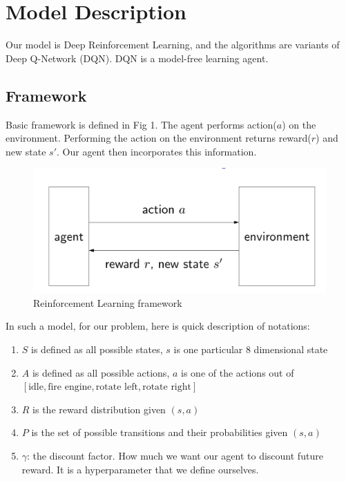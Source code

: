 \section{Model Description}
\label{sec:Model}

Our model is Deep Reinforcement Learning, and the algorithms are variants of Deep Q-Network (DQN). DQN is a model-free learning agent.

\subsection{Framework}
Basic framework is defined in Fig 1. The agent performs action($a$) on the environment. Performing the action on the environment returns reward($r$) and new state $s'$. Our agent then incorporates this information.

\begin{figure}%
\centering
\includegraphics[scale=0.3]{reinforcement_framework.png}%
\caption{Reinforcement Learning framework}%
\label{fig:datastats}%
\end{figure}

In such a model, for our problem, here is quick description of notations:
\begin{enumerate}
\item $S$ is defined as all possible states, $s$ is one particular 8 dimensional state
\item $A$ is defined as all possible actions, $a$ is one of the actions out of $[\text{idle}, \text{fire engine}, \text{rotate left}, \text{rotate right}]$
\item $R$ is the reward distribution given $(s, a)$
\item $P$ is the set of possible transitions and their probabilities given $(s, a)$
\item $\gamma$: the discount factor. How much we want our agent to discount future reward. It is a hyperparameter that we define ourselves.
\end{enumerate}

